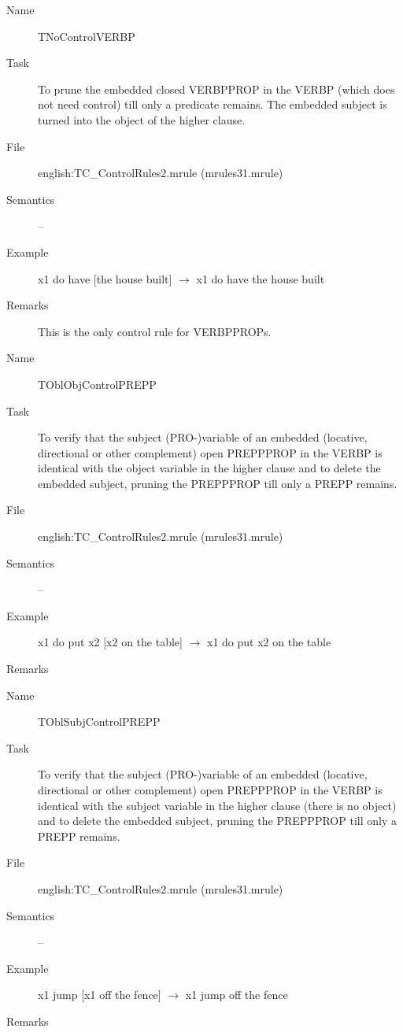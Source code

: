 \begin{description}
\vspace{1 cm}
\begin{description}
\item[Name] TNoControlVERBP
\item[Task] To prune the embedded closed VERBPPROP in the VERBP 
(which does not need control) 
till only a predicate remains. The embedded subject is turned into the object 
of the higher clause.
\item[File] english:TC\_ControlRules2.mrule (mrules31.mrule)
\item[Semantics] --
\item[Example] x1 do have [the house built] $\rightarrow$ x1 do have the 
house built
\item[Remarks] This is the only control rule for VERBPPROPs.
\end{description}

\vspace{1 cm}
\begin{description}
\item[Name]   TOblObjControlPREPP
\item[Task] To verify that  the subject (PRO-)variable of an embedded 
(locative, directional or other complement) open PREPPPROP in the VERBP is 
identical with the object variable in the higher clause 
and to delete the embedded subject, pruning the PREPPPROP till only a PREPP
remains. 
\item[File] english:TC\_ControlRules2.mrule (mrules31.mrule)
\item[Semantics] --
\item[Example] x1 do put x2 [x2 on the table] $\rightarrow$ x1 do put x2 on the 
table
\item[Remarks] 
\end{description}

\vspace{1 cm}
\begin{description}
\item[Name] TOblSubjControlPREPP
\item[Task] To verify that  the subject (PRO-)variable of an embedded 
(locative, directional or other complement) open PREPPPROP in the VERBP is 
identical with the subject variable in the higher clause (there is no object)
and to delete the embedded subject, pruning the PREPPPROP till only a PREPP
remains. 
\item[File] english:TC\_ControlRules2.mrule (mrules31.mrule)
\item[Semantics] --
\item[Example] x1 jump [x1 off the fence] $\rightarrow$ x1 jump off the fence
\item[Remarks] 
\end{description}


\end{description}
